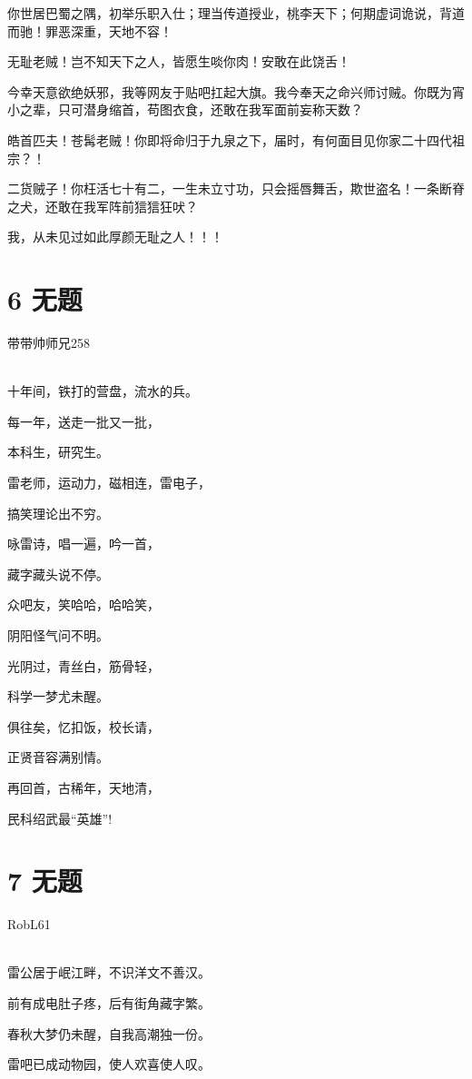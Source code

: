 \documentclass[UTF8,12pt,oneside]{ctexbook}
\begin{document}
        你世居巴蜀之隅，初举乐职入仕；理当传道授业，桃李天下；何期虚词诡说，背道而驰！罪恶深重，天地不容！
        
        无耻老贼！岂不知天下之人，皆愿生啖你肉！安敢在此饶舌！
        
        今幸天意欲绝妖邪，我等网友于贴吧扛起大旗。我今奉天之命兴师讨贼。你既为宵小之辈，只可潜身缩首，苟图衣食，还敢在我军面前妄称天数？
        
        皓首匹夫！苍髯老贼！你即将命归于九泉之下，届时，有何面目见你家二十四代祖宗？！
        
        二货贼子！你枉活七十有二，一生未立寸功，只会摇唇舞舌，欺世盗名！一条断脊之犬，还敢在我军阵前狺狺狂吠？
        
        我，从未见过如此厚颜无耻之人！！！
        
    \newpage
    
    \section{6 无题}
    \begin{center}
        带带帅师兄258
        
        ~\\
        十年间，铁打的营盘，流水的兵。
        
        每一年，送走一批又一批，
        
        本科生，研究生。
        
        雷老师，运动力，磁相连，雷电子，
        
        搞笑理论出不穷。
        
        咏雷诗，唱一遍，吟一首，
        
        藏字藏头说不停。
        
        众吧友，笑哈哈，哈哈笑，
        
        阴阳怪气问不明。
        
        光阴过，青丝白，筋骨轻，
        
        科学一梦尤未醒。
        
        俱往矣，忆扣饭，校长请，
        
        正贤音容满别情。
        
        再回首，古稀年，天地清，
        
        民科绍武最“英雄”!

    \end{center}
    
    
    \section{7 无题}
    \begin{center}
        RobL61
        
        ~\\
        雷公居于岷江畔，不识洋文不善汉。
        
        前有成电肚子疼，后有街角藏字繁。
        
        春秋大梦仍未醒，自我高潮独一份。
        
        雷吧已成动物园，使人欢喜使人叹。

    \end{center}
    
\end{document}
